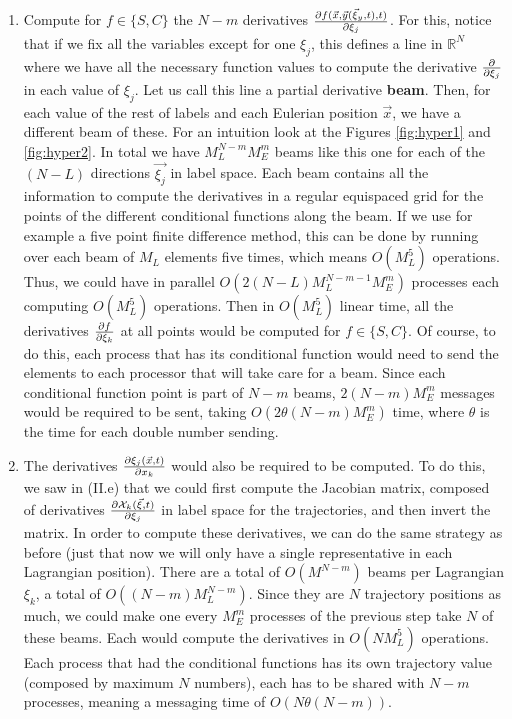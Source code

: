 \documentclass[11pt, a4paper]{article} %
\newcommand{\R}{\mathbb{R}} %
\newcommand{\x}{\mathcal{X}}
\begin{document}
\begin{enumerate}
\begin{enumerate}
\item Compute for $f\in\{S,C\}$ the $N-m$ derivatives $\pdv{f(\vec{x},\vec{y}(\vec{\xi}_y,t),t)}{\xi_j}$. For this, notice that if we fix all the variables except for one $\xi_j$, this defines a line in $\R^N$ where we have all the necessary function values to compute the derivative $\pdv{}{\xi_j}$ in each value of $\xi_j$. Let us call this line a partial derivative {\bf beam}. Then, for each value of the rest of labels and each Eulerian position $\vec{x}$, we have a different beam of these. For an intuition look at the Figures \ref{fig:hyper1} and \ref{fig:hyper2}. In total we have $M_L^{N-m}M_E^m$ beams like this one for each of the $(N-L)$ directions $\vec{\xi_j}$ in label space. Each beam contains all the information to compute the derivatives in a regular equispaced grid for the points of the different conditional functions along the beam. If we use for example a five point finite difference method, this can be done by running over each beam of $M_L$ elements five times, which means $O(M_L^5)$ operations. Thus, we could have in parallel $O(2(N-L)M_L^{N-m-1}M_E^m)$ processes each computing $O(M_L^5)$ operations. Then in $O(M_L^5)$ linear time, all the derivatives $\pdv{f}{\xi_k}$ at all points would be computed for $f\in\{S,C\}$. Of course, to do this, each process that has its conditional function would need to send the elements to each processor that will take care for a beam. Since each conditional function point is part of $N-m$ beams, $2(N-m)M_E^m$ messages would be required to be sent, taking $O(2\theta (N-m)M_E^m)$ time, where $\theta$ is the time for each double number sending.
\item The derivatives $\pdv{\xi_j(\vec{x},t)}{x_k}$ would also be required to be computed. To do this, we saw in (II.e) that we could first compute the Jacobian matrix, composed of derivatives $\pdv{\x_k(\vec{\xi},t)}{\xi_j}$ in label space for the trajectories, and then invert the matrix. In order to compute these derivatives, we can do the same strategy as before (just that now we will only have a single representative in each Lagrangian position). There are a total of $O(M^{N-m})$ beams per Lagrangian $\xi_k$, a total of $O((N-m)M_L^{N-m})$. Since they are $N$ trajectory positions as much, we could make one every $M_E^m$ processes of the previous step take $N$ of these beams. Each would compute the derivatives in $O(NM_L^5)$ operations. Each process that had the conditional functions has its own trajectory value (composed by maximum $N$ numbers), each has to be shared with $N-m$ processes, meaning a messaging time of $O(N\theta (N-m))$.

\end{enumerate}
\end{enumerate}
\end{document}
